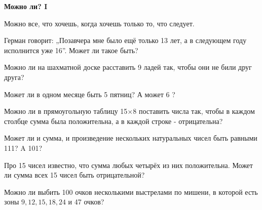 \centerline{\bf \Huge Можно ли? I}

\begin{flushright}
        \scriptsize{Можно все, что хочешь, когда хочешь только то, что следует.}
\end{flushright}


 Герман говорит: „Позавчера мне было ещё только 13 лет, а в следующем году исполнится уже 16”. Может ли такое быть?

 Можно ли на шахматной доске расставить 9 ладей так, чтобы они не били друг друга?

 Может ли в одном месяце быть 5 пятниц? А может 6 ?

 Можно ли в прямоугольную таблицу 15$\times$8 поставить числа так, чтобы в каждом столбце сумма была положительна, а в каждой строке - отрицательна?

 Может ли и сумма, и произведение нескольких натуральных чисел быть равными 111? A 101?

 Про 15 чисел известно, что сумма любых четырёх из них положительна. Может ли сумма всех 15 чисел быть отрицательной?

 Можно ли выбить 100 очков несколькими выстрелами по мишени, в которой есть зоны $9,12,15,18,24$ и 47 очков?
